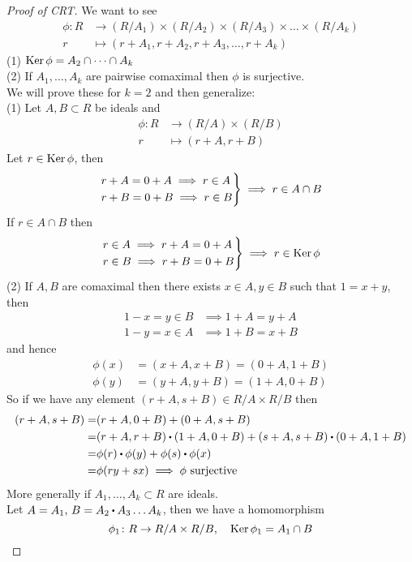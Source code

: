 \documentclass[../Main.tex]{subfiles}
\begin{document}
\begin{proof}[Proof of CRT]
	We want to see
	\begin{align*}
	\phi\colon R&\to (R/A_1)\times (R/A_2)\times (R/A_3)\times\dots\times(R/A_k)\\
	r&\mapsto (r+A_1,r+A_2,r+A_3,\dots,r+A_k)
	\end{align*}
	(1) $\operatorname{Ker} \phi = A_2\cap\dots\cap A_k$\\
	(2) If $A_1,\dots,A_k$ are pairwise comaximal then $\phi$ is surjective.\\
	We will prove these for $k=2$ and then generalize:\\
	(1) Let $A,B\subset R$ be ideals and
	\begin{align*}
	\phi\colon R&\to (R/A)\times (R/B)\\
	r&\mapsto (r+A,r+B)
	\end{align*}
	Let $r\in \operatorname{Ker} \phi$, then 
	\[ \begin{rcases}
	r+A=0+A\implies r\in A\\
	r+B=0+B\implies r\in B
	\end{rcases}\implies r\in A\cap B\]
	If $r\in A\cap B$ then
	\[ \begin{rcases}
	r\in A\implies r+A=0+A\\
	r\in B\implies r+B=0+B
	\end{rcases}\implies r\in \operatorname{Ker} \phi\]
	(2) If $A,B$ are comaximal then there exists $x\in A, y\in B$ such that $1=x+y$, then
	\begin{align*}
		1-x=y\in B &\implies 1+A =y+A\\
		1-y=x\in A &\implies 1+B=x+B
	\end{align*}
	and hence
	\begin{align*}
	\phi(x)&=(x+A,x+B)=(0+A,1+B)\\
	\phi(y)&=(y+A,y+B)=(1+A,0+B)
	\end{align*}
	So if we have any element $(r+A,s+B)\in R/A\times R/B$ then
	\begin{align*}
	(r+A,s+B) =& (r+A,0+B)+(0+A,s+B)\\
	=&(r+A,r+B)\rdot (1+A,0+B)+(s+A,s+B)\rdot (0+A,1+B)\\
	=&\phi(r)\rdot \phi(y) + \phi(s)\rdot \phi(x)\\
	=&\phi(ry+sx)\implies \phi \text{ surjective}
	\end{align*}
	More generally if $A_1,\dots,A_k\subset R$ are ideals.\\
	Let $A=A_1,\, B=A_2\rdot A_3\dots A_k$, then we have a homomorphism
	\[\phi_1 \colon R\to R/A\times R/B, \quad \operatorname{Ker}\phi_1=A_1\cap B \]

\end{proof}
\end{document}
